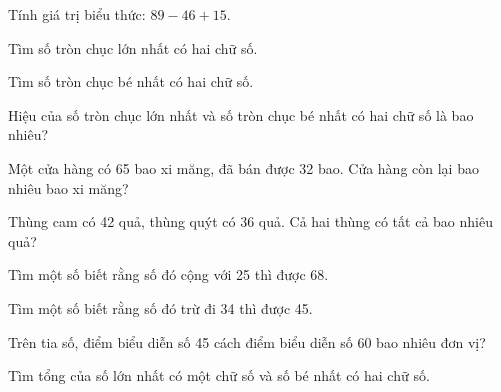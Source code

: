 \begin{ex}
Tính giá trị biểu thức: $89 - 46 + 15$.
\end{ex}

\begin{ex}
Tìm số tròn chục lớn nhất có hai chữ số.
\end{ex}

\begin{ex}
Tìm số tròn chục bé nhất có hai chữ số.
\end{ex}

\begin{ex}
Hiệu của số tròn chục lớn nhất và số tròn chục bé nhất có hai chữ số là bao nhiêu?
\end{ex}

\begin{ex}
Một cửa hàng có 65 bao xi măng, đã bán được 32 bao. Cửa hàng còn lại bao nhiêu bao xi măng?
\end{ex}

\begin{ex}
Thùng cam có 42 quả, thùng quýt có 36 quả. Cả hai thùng có tất cả bao nhiêu quả?
\end{ex}

\begin{ex}
Tìm một số biết rằng số đó cộng với 25 thì được 68.
\end{ex}

\begin{ex}
Tìm một số biết rằng số đó trừ đi 34 thì được 45.
\end{ex}

\begin{ex}
Trên tia số, điểm biểu diễn số 45 cách điểm biểu diễn số 60 bao nhiêu đơn vị?
\end{ex}

\begin{ex}
Tìm tổng của số lớn nhất có một chữ số và số bé nhất có hai chữ số.
\end{ex}

